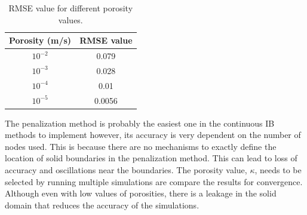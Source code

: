 \begin{table}[H]
\centering
\begin{tabular}{c | c}
	Porosity (m/s) & RMSE value \\ \hline \hline
	$10^{-2}$ & 0.079 \\ \hline
	$10^{-3}$ & 0.028 \\ \hline
	$10^{-4}$ & 0.01 \\ \hline
	$10^{-5}$ & 0.0056
\end{tabular}
\caption{RMSE value for different porosity values.}
\label{table:C3_penalizationResultPorosityRMSE}
\end{table}

The penalization method is probably the easiest one in the continuous IB methods to implement however, its accuracy is very dependent on the number of nodes used. This is because there are no mechanisms to exactly define the location of solid boundaries in the penalization method. This can lead to loss of accuracy and oscillations near the boundaries. The porosity value, $\kappa$, needs to be selected by running multiple simulations are compare the results for convergence. Although even with low values of porosities, there is a leakage in the solid domain that reduces the accuracy of the simulations.